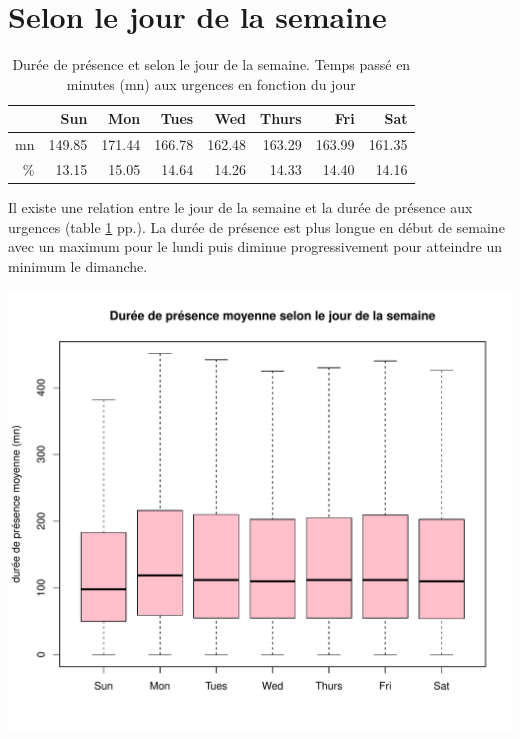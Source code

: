 \documentclass[12pt,english,french,twoside]{book}\usepackage[]{graphicx}\usepackage[]{color}
\makeatletter
\def\maxwidth{ %
  \ifdim\Gin@nat@width>\linewidth
    \linewidth
  \else
    \Gin@nat@width
  \fi
}
\newenvironment{knitrout}{}{} %
\makeatother
\begin{document}

\section{Selon le jour de la semaine}

\begin{table}[ht]
\centering
\begin{tabular}{rrrrrrrr}
  \hline
 & Sun & Mon & Tues & Wed & Thurs & Fri & Sat \\ 
  \hline
mn & 149.85 & 171.44 & 166.78 & 162.48 & 163.29 & 163.99 & 161.35 \\ 
  \% & 13.15 & 15.05 & 14.64 & 14.26 & 14.33 & 14.40 & 14.16 \\ 
   \hline
\end{tabular}
\caption[Durée de présence et jour de la semaine]{Durée de présence et selon le jour de la semaine. Temps passé en minutes (mn) aux urgences en fonction du jour} 
\label{tab:jour_semaine}
\end{table}



Il existe une relation entre le jour de la semaine et la durée de présence aux urgences (table \ref{tab:jour_semaine} pp.\pageref{tab:jour_semaine}). La durée de présence est plus longue en début de semaine avec un maximum pour le lundi puis diminue progressivement pour atteindre un minimum le dimanche.

\begin{center}
\begin{knitrout}
\color{fgcolor}
\includegraphics[width=\maxwidth]{figure/bp_jour_presence} 

\end{knitrout}

 \label{duree_jour}
\end{center}
\end{document}
